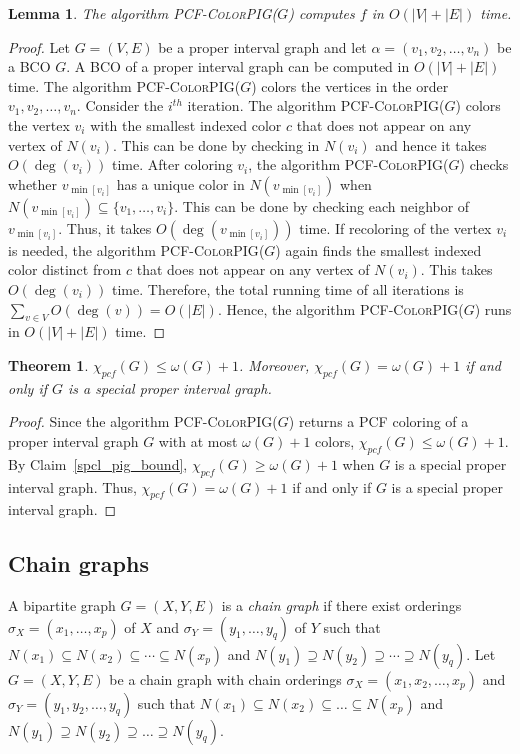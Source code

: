 \documentclass[11pt]{article}
\theoremstyle{plain}
\newtheorem{theorem}{Theorem}
\newtheorem{lemma}{Lemma}
\begin{document}
\begin{lemma}
	The algorithm \textsc{PCF-ColorPIG}($G$) computes $f$ in $O(|V|+|E|)$ time.
\end{lemma}
\begin{proof}
	Let $G=(V,E)$ be a proper interval graph and let 
	$\alpha=(v_1,v_2,\ldots,v_n)$ be a BCO $G$.
	A BCO of a proper interval graph can be computed in $O(|V|+|E|)$ time. The algorithm \textsc{PCF-ColorPIG}($G$) colors the vertices in the order $v_1,v_2,\ldots,v_n$.
	Consider the $i^{th}$ iteration.
	The algorithm \textsc{PCF-ColorPIG}($G$) colors the vertex $v_i$ with the smallest indexed color $c$ that does not appear on any vertex of $N(v_i)$. This can be done by checking in $N(v_i)$ and hence it takes $O(\deg(v_i))$ time. After coloring $v_i$, the algorithm \textsc{PCF-ColorPIG}($G$) checks whether $v_{\min[v_i]}$ has a unique color in $N(v_{\min[v_i]})$ when $N(v_{\min[v_i]})\subseteq \{v_1, \ldots, v_i\}$. This can be done by checking each neighbor of $v_{\min[v_i]}$. Thus, it takes $O(\deg(v_{\min[v_i]}))$ time. If recoloring of the vertex $v_i$ is needed, the algorithm \textsc{PCF-ColorPIG}($G$) again finds the smallest indexed color distinct from $c$ that does not appear on any vertex of $N(v_i)$. This takes $O(\deg(v_i))$ time. Therefore, the total running time of all iterations is $\sum_{v \in V} O(\deg(v)) = O(|E|)$.
	Hence, the algorithm \textsc{PCF-ColorPIG}($G$) runs in $O(|V|+|E|)$ time.
\end{proof}




\begin{theorem}\label{pig_bound}
	$\chi_{pcf}(G)\leq\omega(G)+1$. Moreover, $\chi_{pcf}(G)=\omega(G)+1$ if and only if $G$ is a special proper interval graph.
\end{theorem}
\begin{proof}
	Since the algorithm \textsc{PCF-ColorPIG}($G$) returns a PCF coloring of a proper interval graph $G$ with at most $\omega(G)+1$ colors, $\chi_{pcf}(G) \leq \omega(G)+1$.  By Claim~\ref{spcl_pig_bound}, $\chi_{pcf}(G)\geq \omega(G)+1$ when $G$ is a special proper interval graph. Thus, $\chi_{pcf}(G)=\omega(G)+1$ if and only if $G$ is a special proper interval graph.
\end{proof}

\subsection{Chain graphs}

A bipartite graph $G=(X,Y,E)$ is a \emph{chain graph} if there exist orderings $\sigma_X=(x_1,\ldots,x_p)$ of $X$ and $\sigma_Y=(y_1,\ldots,y_q)$ of $Y$ such that $N(x_1)\subseteq N(x_2)\subseteq \cdots\subseteq N(x_p)$ and $N(y_1)\supseteq N(y_2)\supseteq \cdots\supseteq N(y_q)$.
Let $G=(X,Y,E)$ be a chain graph with chain orderings $\sigma_X=(x_1, x_2, \ldots, x_p)$ and $\sigma_Y=(y_1, y_2, \ldots, y_q)$ such that $N(x_1) \subseteq N(x_2) \subseteq \ldots \subseteq N(x_p)$ and $N(y_1) \supseteq N(y_2) \supseteq \ldots \supseteq N(y_q)$. 
\end{document}
